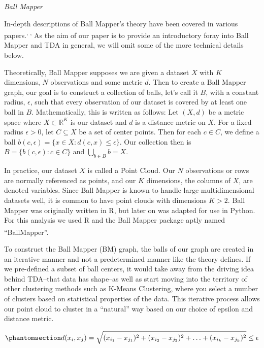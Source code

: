 \documentclass[
  10pt,
  letterpaper,
  DIV=11,
  numbers=noendperiod]{scrartcl}
\begin{document}
\emph{Ball Mapper}

In-depth descriptions of Ball Mapper's theory have been covered in
various
papers.\textsuperscript{,
,
} As the aim of our paper is
to provide an introductory foray into Ball Mapper and TDA in general, we
will omit some of the more technical details below.

Theoretically, Ball Mapper supposes we are given a dataset \(X\) with
\(K\) dimensions, \(N\) observations and some metric \(d\). Then to
create a Ball Mapper graph, our goal is to construct a collection of
balls, let's call it \(B\), with a constant radius, \(\epsilon\), such
that every observation of our dataset is covered by at least one ball in
\(B\). Mathematically, this is written as follows: Let \((X, d)\) be a
metric space where \(X \subset \mathbb{R}^K\) is our dataset and \(d\)
is a distance metric on \(X\). For a fixed radius \(\epsilon >0\), let
\(C \subseteq X\) be a set of center points. Then for each \(c \in C\),
we define a ball
\(b(c, \epsilon) = \{x \in X : d(c, x) \leq \epsilon\}\). Our collection
then is \(B = \{b(c, \epsilon) : c \in C\}\) and
\(\bigcup_{b \in B} b = X\).

In practice, our dataset \(X\) is called a Point Cloud. Our \(N\)
observations or rows are normally referenced as points, and our \(K\)
dimensions, the columns of \(X\), are denoted variables. Since Ball
Mapper is known to handle large multidimensional datasets well, it is
common to have point clouds with dimensions \(K > 2\). Ball Mapper was
originally written in R, but later on was adapted for use in Python. For
this analysis we used R and the Ball Mapper package aptly named
``BallMapper''.\textsuperscript{}

To construct the Ball Mapper (BM) graph, the balls of our graph are
created in an iterative manner and not a predetermined manner like the
theory defines. If we pre-defined a subset of ball centers, it would
take away from the driving idea behind TDA--that data has shape--as well
as start moving into the territory of other clustering methods such as
K-Means Clustering, where you select a number of clusters based on
statistical properties of the data. This iterative process allows our
point cloud to cluster in a ``natural'' way based on our choice of
epsilon and distance metric.

\begin{equation}\phantomsection\label{eq-euclideanDistance}{
d(x_i, x_j) = 
\sqrt{(x_{i_1} - x_{j_1})^2 + (x_{i_2} - x_{j_2})^2 + \ldots + (x_{i_k} - x_{j_k})^2} \leq \epsilon
}\end{equation}
\end{document}
